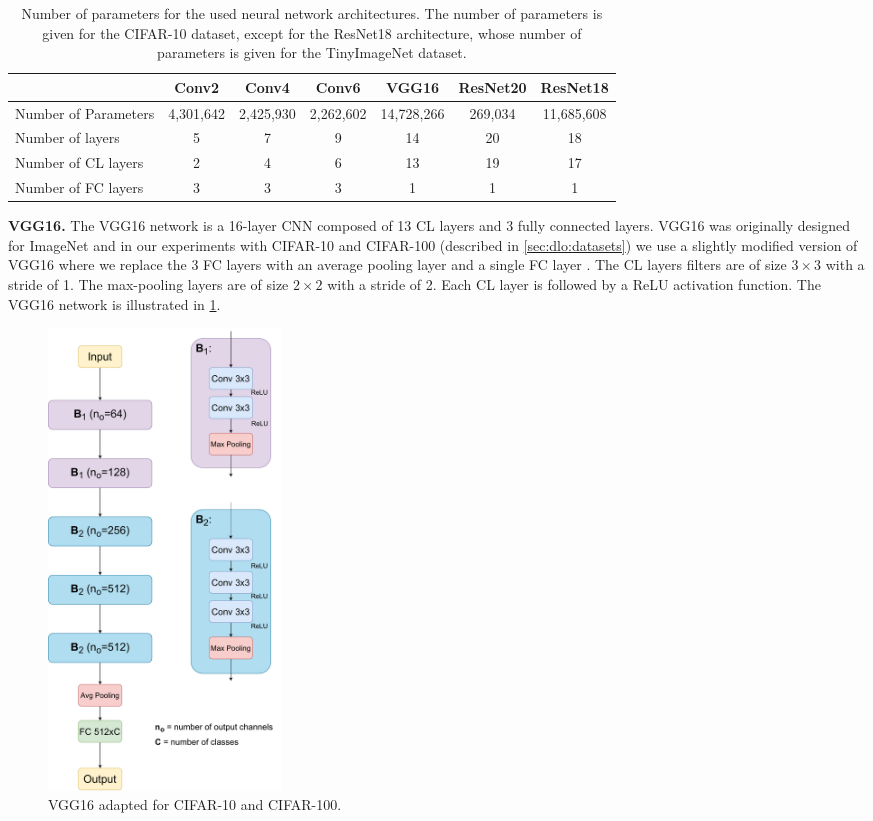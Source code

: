 \begin{table}[ht!]
  \centering
  \begin{tabular}{lcccccc}
    \cline{2-7}
    & \textbf{Conv2} & \textbf{Conv4} & \textbf{Conv6} & \textbf{VGG16} & \textbf{ResNet20} & \textbf{ResNet18} \\ \hline
    Number of Parameters & 4,301,642 & 2,425,930  & 2,262,602      & 14,728,266
    & 269,034           & 11,685,608 \\
    Number of layers & 5 & 7 & 9 & 14 & 20 & 18 \\
    Number of \ac{CL} layers & 2 & 4 & 6 & 13 & 19 & 17 \\
    Number of \ac{FC} layers & 3 & 3 & 3 & 1 & 1 & 1 \\ \hline
  \end{tabular}
  \caption{Number of parameters for the used neural network architectures. The
  number of parameters is given for the CIFAR-10 dataset, except for the
  ResNet18 architecture, whose number of parameters is given for the
  TinyImageNet dataset.}
  \label{tab:dlo:networks_size}
\end{table}

\noindent \textbf{VGG16.} The VGG16 network
\cite{DBLP:journals/corr/SimonyanZ14a} is a 16-layer \ac{CNN} composed of 13
\ac{CL} layers and 3 fully connected layers. VGG16 was originally designed
for ImageNet \cite{deng2009imagenet} and in our experiments with CIFAR-10 and
CIFAR-100 (described in \cref{sec:dlo:datasets}) we use a slightly modified
version of VGG16 where we replace the 3 \ac{FC} layers with an average pooling
layer and a single \ac{FC} layer \cite{vggcifar}. The \ac{CL} layers
filters are of size $3\times 3$ with a stride of 1. The max-pooling layers are
of size $2\times 2$ with a stride of 2. Each \ac{CL} layer is followed by
a \ac{ReLU} activation function. The VGG16 network is illustrated in
\cref{fig:dlo:vgg16_cifar}.\\

\begin{figure}[htbp]
  \centering
  \includegraphics[width=0.30\textwidth]{chapter_dlo/assets/vgg16_cifar.pdf}
  \caption{VGG16 adapted for CIFAR-10 and CIFAR-100.}
  \label{fig:dlo:vgg16_cifar}
\end{figure}

